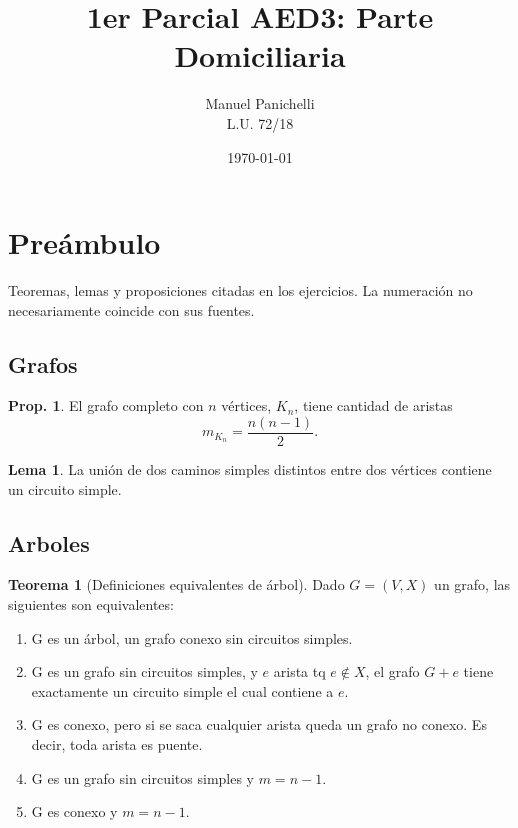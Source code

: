 \documentclass[12pt, a4paper]{report}
\title{1er Parcial AED3: Parte Domiciliaria}
\author{Manuel Panichelli\\L.U. 72/18}
\date{\today}
\theoremstyle{definition} %
\newtheorem{theorem}{Teorema}
\newtheorem{lemma}{Lema}
\newtheorem{proposition}{Prop.}
\begin{document}
\maketitle
\newpage

\chapter*{Preámbulo}

Teoremas, lemas y proposiciones citadas en los ejercicios. La numeración no necesariamente coincide con sus fuentes.

\section*{Grafos}

\begin{proposition}\label{grafos/k_n}
    El grafo completo con $n$ vértices, $K_n$, tiene cantidad de aristas
    \[ m_{K_n} = \frac{n(n-1)}{2}. \]
\end{proposition}

\begin{lemma}\label{grafos/union-caminos}
    La unión de dos caminos simples distintos entre dos vértices contiene un circuito simple.
\end{lemma}

\section*{Arboles}

\begin{theorem}[Definiciones equivalentes de árbol]\label{teo:tree-equiv}
    Dado $G = (V, X)$ un grafo, las siguientes son equivalentes:

    \begin{enumerate}
        \item G es un árbol, un grafo conexo sin circuitos simples.
        \item G es un grafo sin circuitos simples, y $e$ arista tq $e \notin X$,
        el grafo $G + e$ tiene exactamente un circuito simple el cual contiene a
        $e$.\label{teo:tree-equiv-circ}
        \item G es conexo, pero si se saca cualquier arista queda un grafo no
        conexo. Es decir, toda arista es puente.\label{teo:tree-equiv-puentes}

        \item G es un grafo sin circuitos simples y $m=n-1$.
        \item G es conexo y $m=n-1$.\label{teo:tree/equiv/conexo-n-1}
    \end{enumerate}
\end{theorem}
\end{document}
